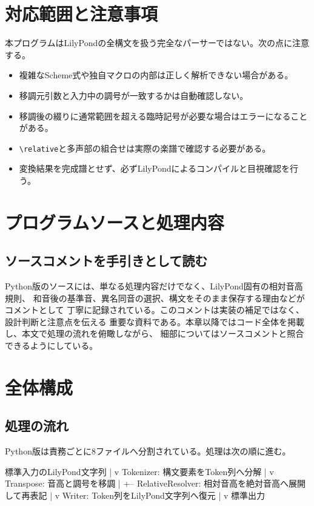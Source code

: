 \documentclass[uplatex,a4paper,11pt]{jsbook}
\begin{document}
\chapter{対応範囲と注意事項}

本プログラムはLilyPondの全構文を扱う完全なパーサーではない。次の点に注意する。

\begin{itemize}
  \item 複雑なScheme式や独自マクロの内部は正しく解析できない場合がある。
  \item 移調元引数と入力中の調号が一致するかは自動確認しない。
  \item 移調後の綴りに通常範囲を超える臨時記号が必要な場合はエラーになることがある。
  \item \texttt{\textbackslash relative}と多声部の組合せは実際の楽譜で確認する必要がある。
  \item 変換結果を完成譜とせず、必ずLilyPondによるコンパイルと目視確認を行う。
\end{itemize}

\chapter{プログラムソースと処理内容}

\section{ソースコメントを手引きとして読む}

Python版のソースには、単なる処理内容だけでなく、LilyPond固有の相対音高規則、
和音後の基準音、異名同音の選択、構文をそのまま保存する理由などがコメントとして
丁寧に記録されている。このコメントは実装の補足ではなく、設計判断と注意点を伝える
重要な資料である。本章以降ではコード全体を掲載し、本文で処理の流れを俯瞰しながら、
細部についてはソースコメントと照合できるようにしている。

\chapter{全体構成}

\section{処理の流れ}

Python版は責務ごとに8ファイルへ分割されている。処理は次の順に進む。

\begin{command}
標準入力のLilyPond文字列
        |
        v
Tokenizer: 構文要素をToken列へ分解
        |
        v
Transpose: 音高と調号を移調
        |
        +-- RelativeResolver: 相対音高を絶対音高へ展開して再表記
        |
        v
Writer: Token列をLilyPond文字列へ復元
        |
        v
標準出力
\end{command}
\end{document}
